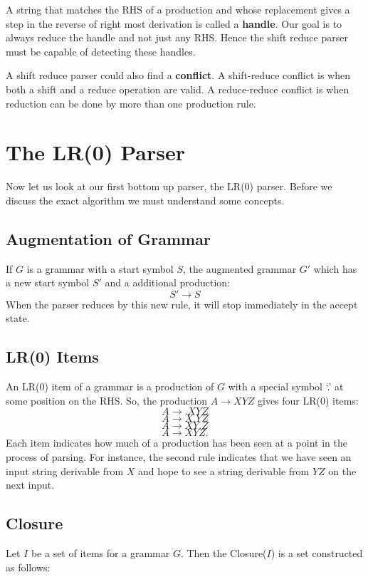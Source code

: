 \documentclass[12pt,letterpaper]{amsbook}
\theoremstyle{definition}
\begin{document}
A string that matches the RHS of a production and whose replacement gives a step in the reverse of right most derivation is called a \textbf{handle}. Our goal is to always reduce the handle and not just any RHS. Hence the shift reduce parser must be capable of detecting these handles.

A shift reduce parser could also find a \textbf{conflict}. A shift-reduce conflict is when both a shift and a reduce operation are valid. A reduce-reduce conflict is when reduction can be done by more than one production rule.

\section{The LR(0) Parser}

Now let us look at our first bottom up parser, the LR(0) parser. Before we discuss the exact algorithm we must understand some concepts. 

\subsection{Augmentation of Grammar}

If $G$ is a grammar with a start symbol $S$, the augmented grammar $G'$ which has a new start symbol $S'$ and a additional production:
\[S' \rightarrow S\]
When the parser reduces by this new rule, it will stop immediately in the accept state.

\subsection{LR(0) Items}

An LR(0) item of a grammar is a production of $G$ with a special symbol `.' at some position on the RHS. So, the production $A \rightarrow XYZ$ gives four LR(0) items:
\[A \rightarrow .XYZ\]
\[A \rightarrow X.YZ\]
\[A \rightarrow XY.Z\]
\[A \rightarrow XYZ.\]
Each item indicates how much of a production has been seen at a point in the process of parsing. For instance, the second rule indicates that we have seen an input string derivable from $X$ and hope to see a string derivable from $YZ$ on the next input.

\subsection{Closure}

Let $I$ be a set of items for a grammar $G$. Then the Closure($I$) is a set constructed as follows:
\end{document}
